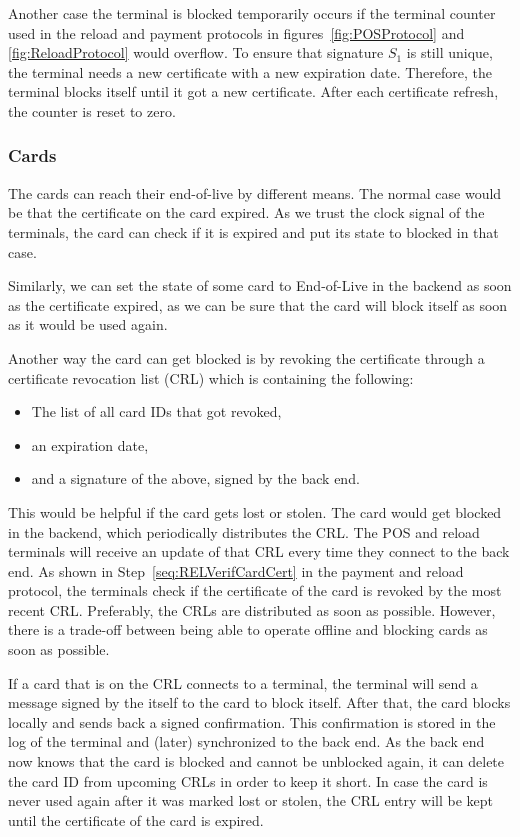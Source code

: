 \documentclass{article}
\begin{document}
Another case the terminal is blocked temporarily occurs if the terminal counter used in the reload and payment protocols in figures~\ref{fig:POSProtocol} and \ref{fig:ReloadProtocol} would overflow.
To ensure that signature $S_1$ is still unique, the terminal needs a new certificate with a new expiration date.
Therefore, the terminal blocks itself until it got a new certificate.
After each certificate refresh, the counter is reset to zero.

\subsubsection{Cards} \label{sec:blockCards}
The cards can reach their end-of-live by different means.
The normal case would be that the certificate on the card expired.
As we trust the clock signal of the terminals, the card can check if it is expired and put its state to blocked in that case.

Similarly, we can set the state of some card to End-of-Live in the backend as soon as the certificate expired, as we can be sure that the card will block itself as soon as it would be used again.

Another way the card can get blocked is by revoking the certificate through a certificate revocation list (CRL) which is containing the following:
\begin{itemize}
    \item The list of all card IDs that got revoked,
    \item an expiration date,
    \item and a signature of the above, signed by the back end.
\end{itemize}
This would be helpful if the card gets lost or stolen.
The card would get blocked in the backend, which periodically distributes the CRL.
The POS and reload terminals will receive an update of that CRL every time they connect to the back end.
As shown in Step~\ref{seq:RELVerifCardCert} in the payment and reload protocol, the terminals check if the certificate of the card is revoked by the most recent CRL\@.
Preferably, the CRLs are distributed as soon as possible. 
However, there is a trade-off between being able to operate offline and blocking cards as soon as possible.

If a card that is on the CRL connects to a terminal, the terminal will send a message signed by the itself to the card to block itself.
After that, the card blocks locally and sends back a signed confirmation.
This confirmation is stored in the log of the terminal and (later) synchronized to the back end.
As the back end now knows that the card is blocked and cannot be unblocked again, it can delete the card ID from upcoming CRLs in order to keep it short.
In case the card is never used again after it was marked lost or stolen, the CRL entry will be kept until the certificate of the card is expired.
\end{document}

